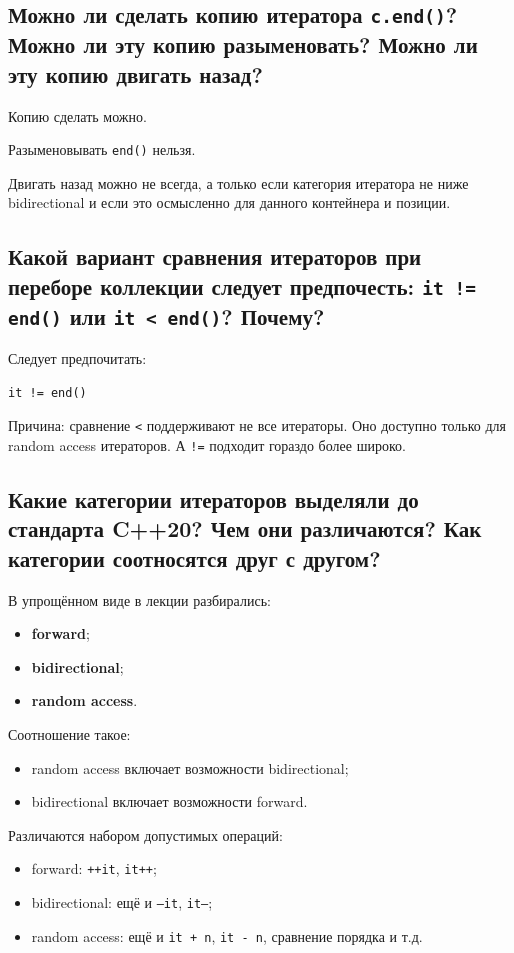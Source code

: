 \subsection{Можно ли сделать копию итератора \texttt{c.end()}? Можно ли эту копию разыменовать? Можно ли эту копию двигать назад?}

Копию сделать можно.

Разыменовывать \texttt{end()} нельзя.

Двигать назад можно не всегда, а только если категория итератора не ниже bidirectional и если это осмысленно для данного контейнера и позиции.


\subsection{Какой вариант сравнения итераторов при переборе коллекции следует предпочесть: \texttt{it != end()} или \texttt{it < end()}? Почему?}

Следует предпочитать:
\begin{verbatim}
it != end()
\end{verbatim}

Причина: сравнение \texttt{<} поддерживают не все итераторы. Оно доступно только для random access итераторов. А \texttt{!=} подходит гораздо более широко.


\subsection{Какие категории итераторов выделяли до стандарта C++20? Чем они различаются? Как категории соотносятся друг с другом?}

В упрощённом виде в лекции разбирались:
\begin{itemize}
    \item \textbf{forward};
    \item \textbf{bidirectional};
    \item \textbf{random access}.
\end{itemize}

Соотношение такое:
\begin{itemize}
    \item random access включает возможности bidirectional;
    \item bidirectional включает возможности forward.
\end{itemize}

Различаются набором допустимых операций:
\begin{itemize}
    \item forward: \texttt{++it}, \texttt{it++};
    \item bidirectional: ещё и \texttt{--it}, \texttt{it--};
    \item random access: ещё и \texttt{it + n}, \texttt{it - n}, сравнение порядка и т.д.
\end{itemize}


